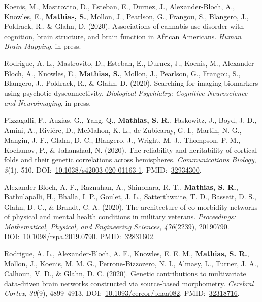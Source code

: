 \documentclass[10pt]{article}
\makeatletter
\newlength{\bibhang}
\newlength{\bibsep}
 {\@listi \global\bibsep\itemsep \global\advance\bibsep by\parsep}
\newenvironment{bibsection}%
        {\vspace{-\baselineskip}\begin{list}{}{%
       \setlength{\leftmargin}{\bibhang}%
       \setlength{\itemindent}{-\leftmargin}%
       \setlength{\itemsep}{\bibsep}%
       \setlength{\parsep}{\z@}%
        \setlength{\partopsep}{0pt}%
        \setlength{\topsep}{0pt}}}
        {\end{list}\vspace{-.6\baselineskip}}
\makeatother
\begin{document}
\begin{bibsection}
\item Koenis, M., Mastrovito, D., Esteban, E., Durnez, J., Alexander-Bloch, A., Knowles, E., \textbf{Mathias, S.}, Mollon, J., Pearlson, G., Frangou, S., Blangero, J., Poldrack, R., \& Glahn, D. (2020). Associations of cannabis use disorder with cognition, brain structure, and brain function in African Americans. \emph{Human Brain Mapping}, in press.

\item Rodrigue, A. L., Mastrovito, D., Esteban, E., Durnez, J., Koenis, M., Alexander-Bloch, A., Knowles, E., \textbf{Mathias, S.}, Mollon, J., Pearlson, G., Frangou, S., Blangero, J., Poldrack, R., \& Glahn, D. (2020). Searching for imaging biomarkers using psychotic dysconnectivity. \emph{Biological Psychiatry: Cognitive Neuroscience and Neuroimaging}, in press.

\item Pizzagalli, F., Auzias, G., Yang, Q.,  \textbf{Mathias, S. R.}, Faskowitz, J., Boyd, J. D., Amini, A., Rivi\'ere, D., McMahon, K. L., de Zubicaray, G. I., Martin, N. G., Mangin, J. F., Glahn, D. C., Blangero, J., Wright, M. J., Thompson, P. M., Kochunov, P., \& Jahanshad, N. (2020). The reliability and heritability of cortical folds and their genetic correlations across hemispheres. \emph{Communications Biology}, \emph{3}(1), 510. DOI:~\href{https://doi.org/10.1038/s42003-020-01163-1}{10.1038/s42003-020-01163-1}. PMID:~\href{https://www.ncbi.nlm.nih.gov/pubmed/?term=32934300}{32934300}.

\item Alexander-Bloch, A. F., Raznahan, A., Shinohara, R. T., \textbf{Mathias, S. R.}, Bathulapalli, H., Bhalla, I. P., Goulet, J. L., Satterthwaite, T. D., Bassett, D. S., Glahn, D. C., \& Brandt, C. A. (2020). The architecture of co-morbidity networks of physical and mental health conditions in military veterans. \emph{Proceedings: Mathematical, Physical, and Engineering Sciences}, \emph{476}(2239), 20190790. DOI:~\href{https://doi.org/10.1098/rspa.2019.0790}{10.1098/rspa.2019.0790}. PMID:~\href{https://www.ncbi.nlm.nih.gov/pubmed/?term=32831602}{32831602}.

\item Rodrigue, A. L., Alexander-Bloch, A. F., Knowles, E. E. M., \textbf{Mathias, S. R.}, Mollon, J., Koenis, M. M. G., Perrone-Bizzozero, N. I., Almasy, L., Turner, J. A., Calhoun, V. D., \& Glahn, D. C. (2020). Genetic contributions to multivariate data-driven brain networks constructed via source-based morphometry. \emph{Cerebral Cortex}, \emph{30}(9), 4899--4913. DOI:~\href{https://doi.org/10.1093/cercor/bhaa082}{10.1093/cercor/bhaa082}. PMID:~\href{https://www.ncbi.nlm.nih.gov/pubmed/?term=32318716}{32318716}.


\end{bibsection}
\end{document}
